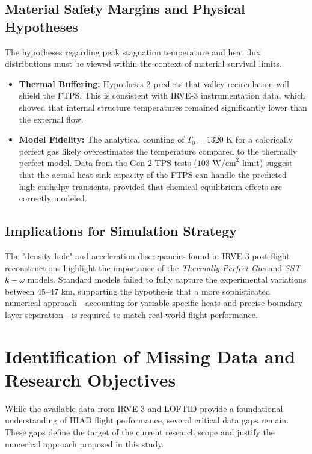\subsection{Material Safety Margins and Physical Hypotheses}
The hypotheses regarding peak stagnation temperature and heat flux distributions must be viewed within the context of material survival limits.
\begin{itemize}
    \item \textbf{Thermal Buffering:} Hypothesis 2 predicts that valley recirculation will shield the FTPS. This is consistent with IRVE-3 instrumentation data, which showed that internal structure temperatures remained significantly lower than the external flow.
    \item \textbf{Model Fidelity:} The analytical counting of $T_0 = 1320$ K for a calorically perfect gas likely overestimates the temperature compared to the thermally perfect model. Data from the Gen-2 TPS tests ($103 \text{ W/cm}^2$ limit) suggest that the actual heat-sink capacity of the FTPS can handle the predicted high-enthalpy transients, provided that chemical equilibrium effects are correctly modeled.
\end{itemize}

\subsection{Implications for Simulation Strategy}
The "density hole" and acceleration discrepancies found in IRVE-3 post-flight reconstructions highlight the importance of the \textit{Thermally Perfect Gas} and \textit{SST $k-\omega$} models. Standard models failed to fully capture the experimental variations between 45--47 km, supporting the hypothesis that a more sophisticated numerical approach—accounting for variable specific heats and precise boundary layer separation—is required to match real-world flight performance.

\section{Identification of Missing Data and Research Objectives}

While the available data from IRVE-3 and LOFTID provide a foundational understanding of HIAD flight performance, several critical data gaps remain. These gaps define the target of the current research scope and justify the numerical approach proposed in this study.

